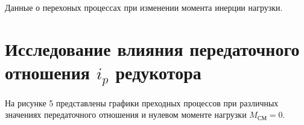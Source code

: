 \documentclass[a4paper, 11pt]{article}
\begin{document}
\begin{table}[h!]
    \caption{Данные о перехоных процессах при изменении момента инерции нагрузки.}
    \centering
\end{table}

\newpage

\section*{Исследование влияния передаточного отношения $i_p$ редукотора}
На рисунке 5 представлены графики преходных процессов при различных значениях передаточного отношения и нулевом моменте нагрузки $M_\text{СМ} = 0$.
\end{document}

